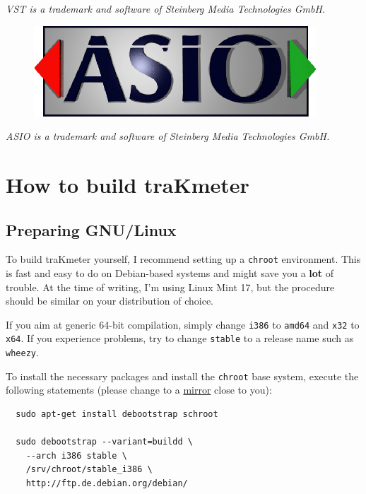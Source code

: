 \emph{VST is a trademark and software of Steinberg Media Technologies
  GmbH.}

\begin{figure}
  \includegraphics[scale=0.60,clip]{include/images/trademark_asio.png}
\end{figure}

\emph{ASIO is a trademark and software of Steinberg Media Technologies
  GmbH.}

\appendix

\chapter{How to build traKmeter}
\label{chap:build_trakmeter}

\section{Preparing GNU/Linux}

To build traKmeter yourself, I recommend setting up a \texttt{chroot}
environment.  This is fast and easy to do on Debian-based systems and
might save you a \textbf{lot} of trouble.  At the time of writing, I'm
using Linux Mint 17, but the procedure should be similar on your
distribution of choice.

If you aim at generic \num{64}-bit compilation, simply change
\texttt{i386} to \texttt{amd64} and \texttt{x32} to \texttt{x64}.  If
you experience problems, try to change \texttt{stable} to a release
name such as \texttt{wheezy}.

To install the necessary packages and install the \texttt{chroot} base
system, execute the following statements (please change
 to a
\href{http://www.debian.org/mirror/list}{mirror} close to you):

\begin{verbatim}
  sudo apt-get install debootstrap schroot

  sudo debootstrap --variant=buildd \
    --arch i386 stable \
    /srv/chroot/stable_i386 \
    http://ftp.de.debian.org/debian/
\end{verbatim}

